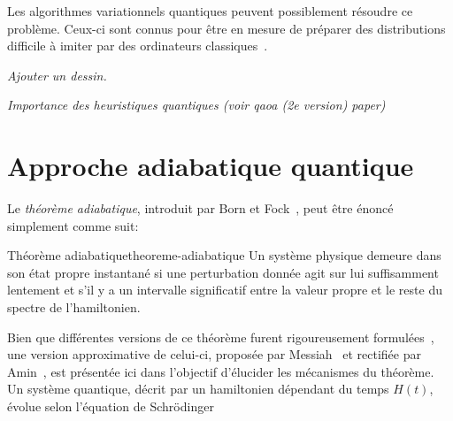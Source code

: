 Les algorithmes variationnels quantiques peuvent possiblement résoudre ce problème. Ceux-ci sont connus pour être en mesure de préparer des distributions difficile à imiter par des ordinateurs classiques~\cite{aaronsonComputationalComplexityLinear2011a, boulandComplexityVerificationQuantum2019}.

\textcolor{mydarkred}{\textit{Ajouter un dessin.}}

\textcolor{mydarkred}{\textit{Importance des heuristiques quantiques (voir qaoa (2e version) paper)}}


\section{Approche adiabatique quantique}

Le \textit{théorème adiabatique}, introduit par Born et Fock~\cite{bornBeweisAdiabatensatzes1928}, peut être énoncé simplement comme suit:

\begin{subtheorem}{Théorème adiabatique}{theoreme-adiabatique}
    Un système physique demeure dans son état propre instantané si une perturbation donnée agit sur lui suffisamment lentement et s'il y a un intervalle significatif entre la valeur propre et le reste du spectre de l'hamiltonien.
\end{subtheorem}

Bien que différentes versions de ce théorème furent rigoureusement formulées~\cite{albashAdiabaticQuantumComputing2018}, une version approximative de celui-ci, proposée par Messiah~\cite{messiahQuantumMechanics1999} et rectifiée par Amin~\cite{aminConsistencyAdiabaticTheorem2009}, est présentée ici dans l'objectif d'élucider les mécanismes du théorème. Un système quantique, décrit par un hamiltonien dépendant du temps $H(t)$, évolue selon l'équation de Schrödinger

